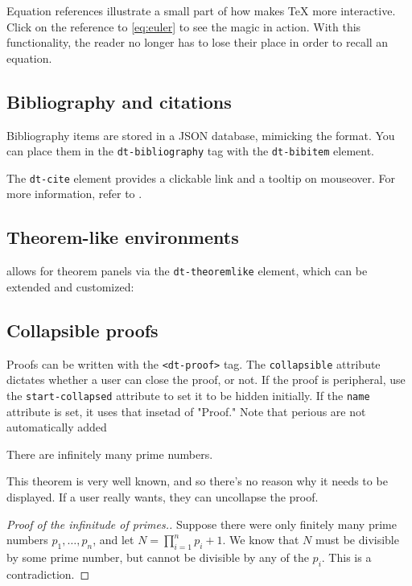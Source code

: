 \documentclass[11pt]{article}
\begin{document}
Equation references illustrate a small part of how \DiscoTeX{} makes \TeX{} more interactive.
Click on the reference to \eqref{eq:euler} to see the magic in action.
With this functionality, the reader no longer has to lose their place in order to recall an equation.

\subsection{Bibliography and citations}
Bibliography items are stored in a JSON database, mimicking the \BibTeX{} format.
You can place them in the \verb|dt-bibliography| tag with the \verb|dt-bibitem| element.

The \verb|dt-cite| element provides a clickable link and a tooltip on mouseover. For more information, refer to \cite{wiki-reftooltip}.

\subsection{Theorem-like environments}
\DiscoTeX{} allows for theorem panels via the \verb|dt-theoremlike| element, which can be extended and customized:

\subsection{Collapsible proofs}
Proofs can be written with the \verb|<dt-proof>| tag.
The \verb|collapsible| attribute dictates whether a user can close the proof, or not.
If the proof is peripheral, use the \verb|start-collapsed| attribute to set it to be hidden initially. If the \verb|name| attribute is set, it uses that insetad of "Proof."
Note that perious are not automatically added

\begin{theorem}[Euclid]
    There are infinitely many prime numbers.
\end{theorem}

This theorem is very well known, and so there's no reason why it needs to be displayed.
If a user really wants, they can uncollapse the proof.

\begin{proof}[Proof of the infinitude of primes.]\dtcollapse\dtstartcollapsed
    Suppose there were only finitely many prime numbers $p_1,\dots,p_n$, and let $N=\prod_{i=1}^n p_i+1$.
    We know that $N$ must be divisible by some prime number, but cannot be divisible by any of the $p_i$.
    This is a contradiction.
\end{proof}
\end{document}
